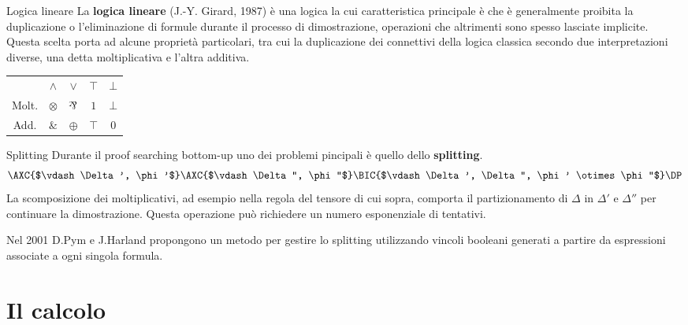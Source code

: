 \documentclass{beamer}
\newcommand{\llpar}{\rotatebox[origin=c]{180}{$\&$}}
\newcommand{\llten}{\otimes}
\newcommand{\llwith}{\&}
\newcommand{\llplus}{\oplus}
\newcommand{\llbot}{\bot}
\newcommand{\lltop}{\top}
\newcommand{\llone}{1}
\newcommand{\llzero}{0}
\begin{document}
\begin{frame}{Logica lineare}
	La \textbf{logica lineare} (J.-Y. Girard, 1987) è una logica la cui caratteristica principale è che è generalmente proibita la duplicazione o l'eliminazione di formule durante il processo di dimostrazione, operazioni che altrimenti sono spesso lasciate implicite.
	Questa scelta porta ad alcune proprietà particolari, tra cui la duplicazione dei connettivi della logica classica secondo due interpretazioni diverse, una detta moltiplicativa e l'altra additiva.
	\begin{center}
		\begin{tabular}{c|cccc|}
			\cline{2-5}
				 & $\wedge$ & $\vee$   & $\top$   & $\bot$ \\
			\cline{2-5}
			\noalign{\vskip\doublerulesep
         			\vskip-\arrayrulewidth}
			\cline{2-5}
			Molt.    & $\llten$  & $\llpar$  & $\llone$ & $\llbot$ \\
			Add.	 & $\llwith$ & $\llplus$ & $\lltop$ & $\llzero$ \\
			\cline{2-5}
		\end{tabular}
	\end{center}
\end{frame}
\begin{frame}{Splitting}
	Durante il proof searching bottom-up uno dei problemi pincipali è quello dello \textbf{splitting}.
	$$
	\AXC{$\vdash \Delta', \phi'$}
	\AXC{$\vdash \Delta'', \phi''$}
	\LeftLabel{$\llten$}
	\BIC{$\vdash \Delta', \Delta'', \phi' \llten \phi''$}
	\DP
	$$
	La scomposizione dei moltiplicativi, ad esempio nella regola del tensore di cui sopra, comporta il partizionamento di $\Delta$ in $\Delta'$ e $\Delta''$ per continuare la dimostrazione.
	Questa operazione può richiedere un numero esponenziale di tentativi.

	Nel 2001 D.Pym e J.Harland propongono un metodo per gestire lo splitting utilizzando vincoli booleani generati a partire da espressioni associate a ogni singola formula.
\end{frame}

\section{Il calcolo}

% 

% 
\end{document}
